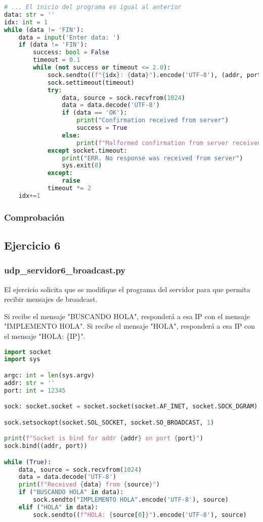 \begin{lstlisting}[language=Python]
# ... El inicio del programa es igual al anterior
data: str = ''
idx: int = 1
while (data != 'FIN'):
    data = input('Enter data: ')
    if (data != 'FIN'):
        success: bool = False
        timeout = 0.1
        while (not success or timeout <= 2.0):
            sock.sendto((f"{idx}: {data}").encode('UTF-8'), (addr, port))
            sock.settimeout(timeout)
            try:
                data, source = sock.recvfrom(1024)
                data = data.decode('UTF-8')
                if (data == 'OK'):
                    print("Confirmation received from server")
                    success = True
                else:
                    print(f"Malformed confirmation from server received ({data})")
            except socket.timeout:
                print("ERR. No response was received from server")
                sys.exit(0)
            except:
                raise
            timeout *= 2
    idx+=1
\end{lstlisting}

\subsubsection{Comprobación}

\subsection{Ejercicio 6}

\subsubsection{udp\_servidor6\_broadcast.py}

El ejercicio solicita que se modifique el programa del servidor para que permita recibir
mensajes de broadcast.

Si recibe el mensaje "BUSCANDO HOLA", responderá a esa IP con el mensaje "IMPLEMENTO HOLA".
Si recibe el mensaje "HOLA", responderá a esa IP con el mensaje "HOLA: \{IP\}".

\begin{lstlisting}[language=Python]
import socket
import sys

argc: int = len(sys.argv)
addr: str = ''
port: int = 12345

sock: socket.socket = socket.socket(socket.AF_INET, socket.SOCK_DGRAM)

sock.setsockopt(socket.SOL_SOCKET, socket.SO_BROADCAST, 1)

print(f"Socket is bind for addr {addr} on port {port}")
sock.bind((addr, port))

while (True):
    data, source = sock.recvfrom(1024)
    data = data.decode('UTF-8')
    print(f"Received {data} from {source}")
    if ("BUSCANDO HOLA" in data):
        sock.sendto("IMPLEMENTO HOLA".encode('UTF-8'), source)
    elif ("HOLA" in data):
        sock.sendto((f"HOLA: {source[0]}").encode('UTF-8'), source)
\end{lstlisting}

